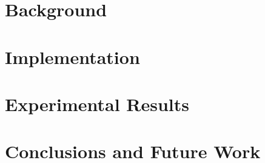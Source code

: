 \documentclass[12pt,twoside]{report}
\begin{document}
\chapter{Background}



%
%
%

\chapter{Implementation}



\chapter{Experimental Results}


\chapter{Conclusions and Future Work}


{}
%
\newpage
{} 
%


\end{document}

